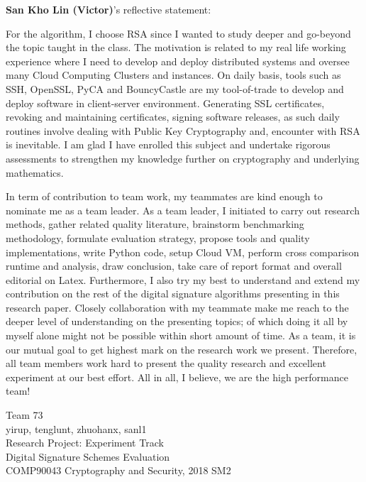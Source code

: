 \documentclass[10pt,sigconf]{acmart}
\begin{document}
\vspace{1em}

\noindent \textbf{San Kho Lin (Victor)}'s reflective statement:

For the algorithm, I choose RSA since I wanted to study deeper and go-beyond the topic taught in the class. The motivation is related to my real life working experience where I need to develop and deploy distributed systems and oversee many Cloud Computing Clusters and instances. On daily basis, tools such as SSH, OpenSSL, PyCA and BouncyCastle are my tool-of-trade to develop and deploy software in client-server environment. Generating SSL certificates, revoking and maintaining certificates, signing software releases, as such daily routines involve dealing with Public Key Cryptography and, encounter with RSA is inevitable. I am glad I have enrolled this subject and undertake rigorous assessments to strengthen my knowledge further on cryptography and underlying mathematics.

In term of contribution to team work, my teammates are kind enough to nominate me as a team leader. As a team leader, I initiated to carry out research methods, gather related quality literature, brainstorm benchmarking methodology, formulate evaluation strategy, propose tools and quality implementations, write Python code, setup Cloud VM, perform cross comparison runtime and analysis, draw conclusion, take care of report format and overall editorial on Latex. Furthermore, I also try my best to understand and extend my contribution on the rest of the digital signature algorithms presenting in this research paper. Closely collaboration with my teammate make me reach to the deeper level of understanding on the presenting topics; of which doing it all by myself alone might not be possible within short amount of time. As a team, it is our mutual goal to get highest mark on the research work we present. Therefore, all team members work hard to present the quality research and excellent experiment at our best effort. All in all, I believe, we are the high performance team!

\vspace{2em}

\noindent Team 73 \\
yirup, tenglunt, zhuohanx, sanl1 \\
Research Project: Experiment Track \\
Digital Signature Schemes Evaluation \\
COMP90043 Cryptography and Security, 2018 SM2
\end{document}
